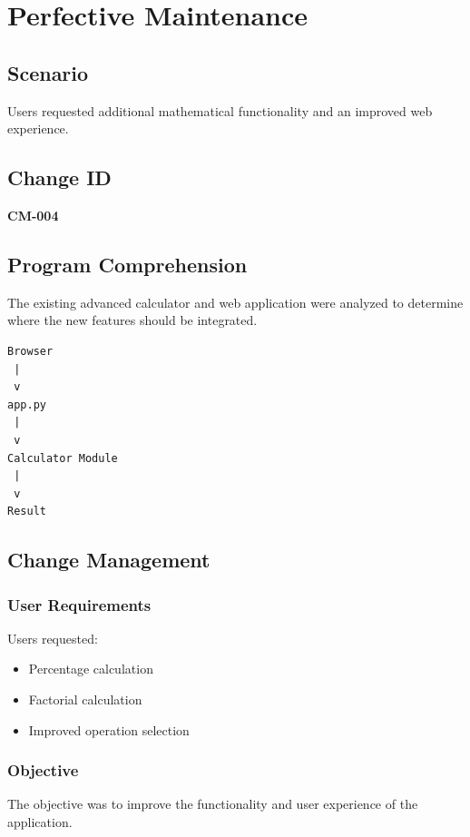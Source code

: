 \documentclass[12pt,a4paper,openany]{report}
\begin{document}
\chapter{Perfective Maintenance}

\section{Scenario}

Users requested additional mathematical functionality and an improved
web experience.

\section{Change ID}

\textbf{CM-004}

\section{Program Comprehension}

The existing advanced calculator and web application were analyzed to
determine where the new features should be integrated.

\begin{verbatim}
Browser
 |
 v
app.py
 |
 v
Calculator Module
 |
 v
Result
\end{verbatim}

\section{Change Management}

\subsection{User Requirements}

Users requested:

\begin{itemize}
    \item Percentage calculation
    \item Factorial calculation
    \item Improved operation selection
\end{itemize}

\subsection{Objective}

The objective was to improve the functionality and user experience of
the application.
\end{document}
